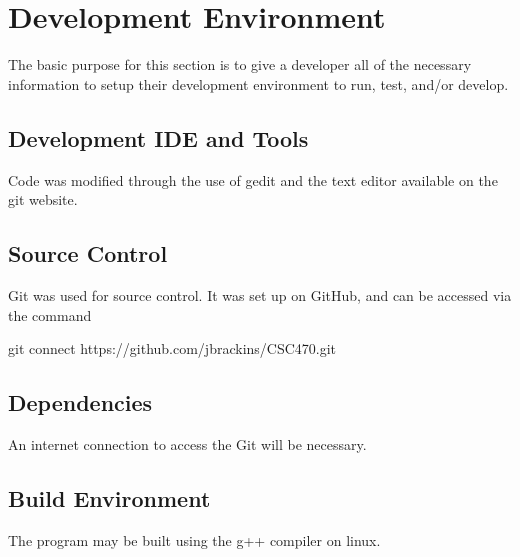 \chapter{Development Environment}
The basic purpose for this section is to give a developer all of the necessary 
information to setup their development environment to run, test, and/or develop. 


\section{Development IDE and Tools}
Code was modified through the use of gedit and the text editor available on the git website.

\section{Source  Control}
Git was used for source control. It was set up on GitHub, and can be accessed via the command
	
	git connect https://github.com/jbrackins/CSC470.git

\section{Dependencies}
An internet connection to access the Git will be necessary.

\section{Build  Environment}
The program may be built using the g++ compiler on linux.


